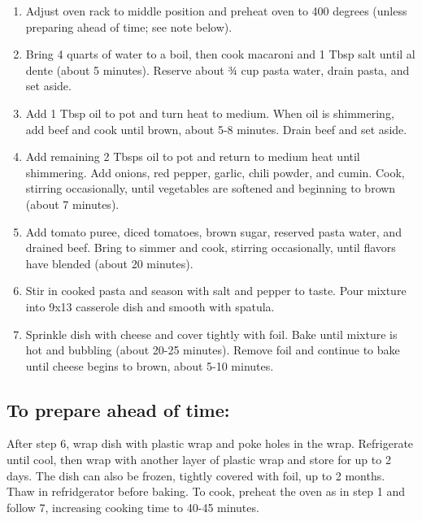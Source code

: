 \documentclass{article}
\begin{document}
\begin{enumerate}
\item Adjust oven rack to middle position and preheat oven to 400 degrees (unless preparing ahead of time; see note below).
\item Bring 4 quarts of water to a boil, then cook macaroni and 1 Tbsp salt until al dente (about 5 minutes).
Reserve about ¾ cup pasta water, drain pasta, and set aside.
\item Add 1 Tbsp oil to pot and turn heat to medium.
When oil is shimmering, add beef and cook until brown, about 5-8 minutes.
Drain beef and set aside.
\item Add remaining 2 Tbsps oil to pot and return to medium heat until shimmering.
Add onions, red pepper, garlic, chili powder, and cumin.
Cook, stirring occasionally, until vegetables are softened and beginning to brown (about 7 minutes).
\item Add tomato puree, diced tomatoes, brown sugar, reserved pasta water, and drained beef.
Bring to simmer and cook, stirring occasionally, until flavors have blended (about 20 minutes).
\item Stir in cooked pasta and season with salt and pepper to taste.
Pour mixture into 9x13 casserole dish and smooth with spatula.
\item Sprinkle dish with cheese and cover tightly with foil.
Bake until mixture is hot and bubbling (about 20-25 minutes).
Remove foil and continue to bake until cheese begins to brown, about 5-10 minutes.
\end{enumerate}

\subsection*{To prepare ahead of time:}

After step 6, wrap dish with plastic wrap and poke holes in the wrap.
Refrigerate until cool, then wrap with another layer of plastic wrap and store for up to 2 days.
The dish can also be frozen, tightly covered with foil, up to 2 months.
Thaw in refridgerator before baking.
To cook, preheat the oven as in step 1 and follow 7, increasing cooking time to 40-45 minutes.
\end{document}
